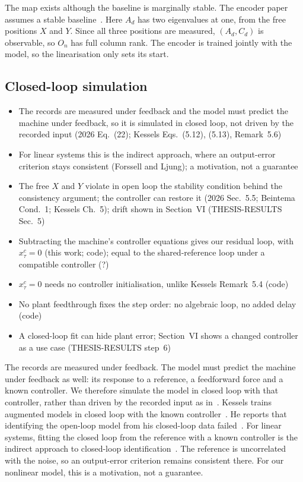 The map exists although the baseline is marginally stable.
The encoder paper assumes a stable baseline~\cite[Sec.~2]{hoekstra2026encoder}.
Here $A_d$ has two eigenvalues at one, from the free positions $X$ and $Y$.
Since all three positions are measured, $(A_d,C_d)$ is observable, so $O_n$
has full column rank.
The encoder is trained jointly with the model, so the linearisation only sets
its start.

\subsection{Closed-loop simulation}\label{sec:aug_loop}
\ifdraft
\begin{itemize}
\item The records are measured under feedback and the model must predict the machine under feedback, so it is simulated in closed loop, not driven by the recorded input (2026 Eq.~(22); Kessels Eqs.~(5.12), (5.13), Remark~5.6)
\item For linear systems this is the indirect approach, where an output-error criterion stays consistent (Forssell and Ljung); a motivation, not a guarantee
\item The free $X$ and $Y$ violate in open loop the stability condition behind the consistency argument; the controller can restore it (2026 Sec.~5.5; Beintema Cond.~1; Kessels Ch.~5); drift shown in Section~VI (THESIS-RESULTS Sec.~5)
\item Subtracting the machine's controller equations gives our residual loop, with $x^c_\tau=0$ (this work; code); equal to the shared-reference loop under a compatible controller (?)
\item $x^c_\tau=0$ needs no controller initialisation, unlike Kessels Remark~5.4 (code)
\item No plant feedthrough fixes the step order: no algebraic loop, no added delay (code)
\item A closed-loop fit can hide plant error; Section~VI shows a changed controller as a use case (THESIS-RESULTS step~6)
\end{itemize}
\fi

The records are measured under feedback.
The model must predict the machine under feedback as well: its response to a
reference, a feedforward force and a known controller.
We therefore simulate the model in closed loop with that controller, rather
than driven by the recorded input as in~\cite[Eq.~(22)]{hoekstra2026lfr}.
Kessels trains augmented models in closed loop with the known
controller~\cite[Eqs.~(5.12), (5.13)]{kessels2025ai}.
He reports that identifying the open-loop model from his closed-loop data
failed~\cite[Remark~5.6]{kessels2025ai}.
For linear systems, fitting the closed loop from the reference with a known
controller is the indirect approach to closed-loop
identification~\cite{forssell1999revisited}.
The reference is uncorrelated with the noise, so an output-error criterion
remains consistent there.
For our nonlinear model, this is a motivation, not a guarantee.

